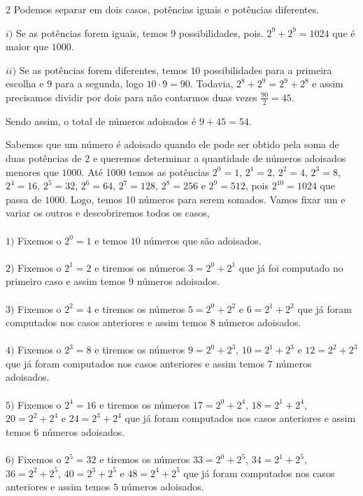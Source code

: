 \begin{solucoes}{2}
\solucao
Podemos separar em dois casos, potências iguais e potências diferentes. 

$i)$ Se as potências forem iguais, temos $9$ possibilidades, pois. $2^9+2^9=1024$ que é maior que $1000$.

$ii)$ Se as potências forem diferentes, temos $10$ possibilidades para a primeira escolha e $9$ para a segunda, logo $10\cdot 9=90$. Todavia, $2^8+2^9=2^9+2^8$ e assim precisamos dividir por dois para não contarmos duas vezes $\frac{90}{2}=45$.

Sendo assim, o total de números adoisados é $9+45=54$.
    
    \solucao
Sabemos que um número é adoisado quando ele pode ser obtido pela soma de duas potências de $2$ e queremos determinar a quantidade de números adoisados menores que $1000$. Até 1000 temos as potências $2^0=1$, $2^1=2$, $2^2=4$, $2^3=8$, $2^4=16$, $2^5=32$, $2^6=64$, $2^7=128$, $2^8=256$ e $2^9=512$, pois $2^{10}=1024$ que passa de $1000$. Logo, temos 10 números para serem somados. Vamos fixar um e variar os outros e descobriremos todos os casos,
\\\\
$1)$ Fixemos o $2^0=1$ e temos $10$ números que são adoisados. 
\\\\
$2)$ Fixemos o $2^1=2$ e tiremos os números $3=2^0+2^1$ que já foi computado no primeiro caso e assim temos $9$ números adoisados. 
\\\\
$3)$ Fixemos  o $2^2=4$ e tiremos os números $5=2^0+2^2$ e $6=2^1+2^2$ que já foram computados nos casos anteriores e assim temos $8$ números adoisados.
\\\\
$4)$ Fixemos  o $2^3=8$ e tiremos os números $9=2^0+2^3$, $10=2^1+2^3$ e $12=2^2+2^3$ que já foram computados nos casos anteriores e assim temos $7$ números adoisados.
\\\\
$5)$ Fixemos  o $2^4=16$ e tiremos os números $17=2^0+2^4$, $18=2^1+2^4$, $20=2^2+2^4$ e $24=2^3+2^4$ que já foram computados nos casos anteriores e assim temos $6$ números adoisados.
\\\\
$6)$ Fixemos  o $2^5=32$ e tiremos os números $33=2^0+2^5$, $34=2^1+2^5$, $36=2^2+2^5$, $40=2^3+2^5$ e $48=2^4+2^5$ que já foram computados nos casos anteriores e assim temos $5$ números adoisados.
\\\\

\end{solucoes}

